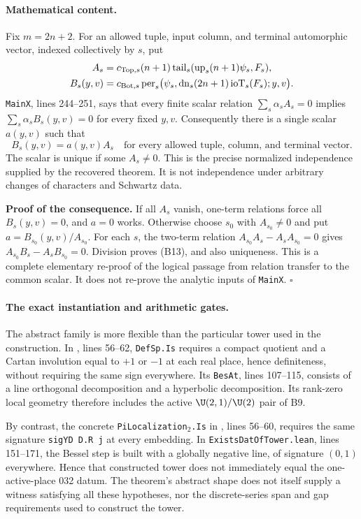 \documentclass[11pt]{article}
\theoremstyle{definition}\newtheorem{definition}[theorem]{Definition}\newtheorem{remark}[theorem]{Remark}
\begin{document}
\paragraph{Mathematical content.}
Fix $m=2n+2$. For an allowed tuple, input column, and terminal automorphic vector, indexed collectively by $s$, put
\begin{align*}
 A_s&=c_{{\rm Top},s}(n+1)
      \operatorname{tail}_s(\operatorname{up}_s(n+1)\psi_s,F_s),\\
 B_s(y,v)&=c_{{\rm Bot},s}
      \operatorname{per}_s\bigl(\psi_s,
       \operatorname{dn}_s(2n+1)\operatorname{ioT}_s(F_s);y,v\bigr).
\end{align*}
\texttt{MainX}, lines 244--251, says that every finite scalar relation
$\sum_s\alpha_s A_s=0$ implies
$\sum_s\alpha_s B_s(y,v)=0$ for every fixed $y,v$.
Consequently there is a single scalar $a(y,v)$ such that
\[
 B_s(y,v)=a(y,v)A_s
 \quad\text{for every allowed tuple, column, and terminal vector.}
 \tag{B13}
\]
The scalar is unique if some $A_s\ne0$. This is the precise normalized independence supplied by the recovered theorem. It is not independence under arbitrary changes of characters and Schwartz data.

\textbf{Proof of the consequence.} If all $A_s$ vanish, one-term relations force all $B_s(y,v)=0$, and $a=0$ works. Otherwise choose $s_0$ with $A_{s_0}\ne0$ and put $a=B_{s_0}(y,v)/A_{s_0}$. For each $s$, the two-term relation
$A_{s_0}A_s-A_sA_{s_0}=0$ gives
$A_{s_0}B_s-A_sB_{s_0}=0$. Division proves (B13), and also uniqueness. This is a complete elementary re-proof of the logical passage from relation transfer to the common scalar. It does not re-prove the analytic inputs of \texttt{MainX}. \hfill$\square$

\paragraph{The exact instantiation and arithmetic gates.}
The abstract family is more flexible than the particular tower used in the construction. In , lines 56--62, \texttt{DefSp.Is} requires a compact quotient and a Cartan involution equal to $+1$ or $-1$ at each real place, hence definiteness, without requiring the same sign everywhere. Its \texttt{BesAt}, lines 107--115, consists of a line orthogonal decomposition and a hyperbolic decomposition. Its rank-zero local geometry therefore includes the active $\U(2,1)/\U(2)$ pair of B9.

By contrast, the concrete \texttt{PiLocalization$_2$.Is} in
, lines 56--60, requires the same signature \texttt{sigYD D.R j} at every embedding. In \texttt{ExistsDatOfTower.lean}, lines 151--171, the Bessel step is built with a globally negative line, of signature $(0,1)$ everywhere. Hence that constructed tower does not immediately equal the one-active-place 032 datum. The theorem's abstract shape does not itself supply a witness satisfying all these hypotheses, nor the discrete-series span and gap requirements used to construct the tower.
\end{document}
